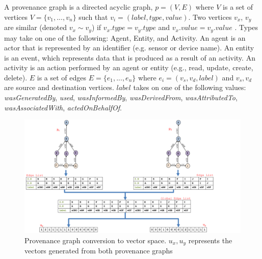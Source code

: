 \begin{definition}

A provenance graph is a directed acyclic graph, $p = (V,E)$ where $V$ is a set of vertices $V =\{v_1,...,v_n\}$ such that $v_i = (label, type, value)$. Two vertices $v_x$, $v_y$ are similar (denoted $ v_x \sim v_y$) if $v_x.type = v_y.type$ and $v_x.value = v_y.value$ . Types may take on one of the following: Agent, Entity, and Activity.  An agent is an actor that is represented by an identifier (e.g. sensor or device name). An entity is an event, which represents data that is produced as a result of an activity. An activity is an action performed by an agent or entity (e.g., read, update, create, delete). $E$ is a set of edges $E =\{e_1,..., e_n\}$ where $e_i = (v_s, v_d, label)$ and $v_s, v_d$ are source and destination vertices. $label$ takes on one of the following values: \textit{wasGeneratedBy}, \textit{used}, \textit{wasInformedBy}, \textit{wasDerivedFrom}, \textit{wasAttributedTo}, \textit{wasAssociatedWith}, \textit{actedOnBehalfOf}. 




\end{definition}


\begin{figure}
\begin{center}
\includegraphics[width=\textwidth]{vector6.pdf}
\end{center}
\caption{Provenance graph conversion to vector space. $u_x, u_y$ represents the vectors generated from both provenance graphs}
\label{prov_vector}
\end{figure}



